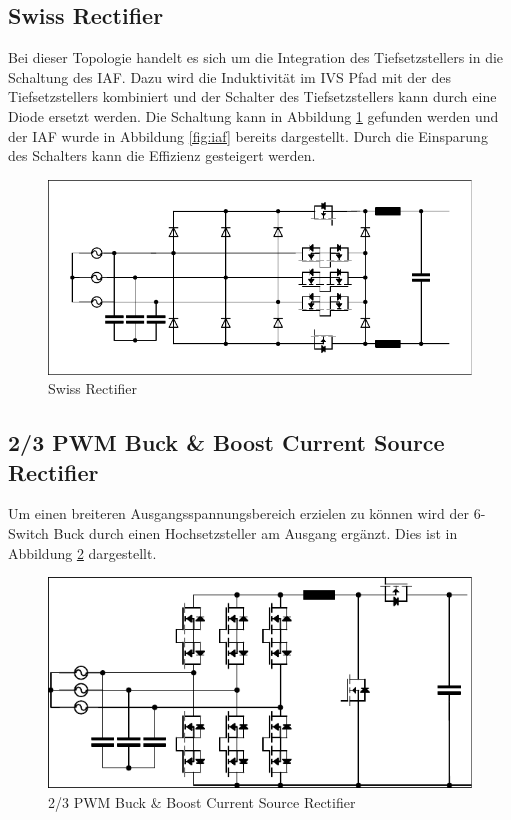 	\subsection{Swiss Rectifier}
		Bei dieser Topologie handelt es sich um die Integration des Tiefsetzstellers in die Schaltung des \gls{IAF}. Dazu wird die Induktivität im \gls{IVS} Pfad mit der des Tiefsetzstellers kombiniert und der Schalter des Tiefsetzstellers kann durch eine Diode ersetzt werden. Die Schaltung kann in Abbildung \ref{fig:swiss} gefunden werden und der \gls{IAF} wurde in Abbildung \ref{fig:iaf} bereits dargestellt. Durch die Einsparung des Schalters kann die Effizienz gesteigert werden. 
		\begin{figure}
			\centering
			\includegraphics[width=0.7\linewidth]{content/Grafiken/Swiss}
			\caption{Swiss Rectifier}
			\label{fig:swiss}
		\end{figure}
		
	\subsection{2/3 PWM Buck \& Boost Current Source Rectifier}	
		Um einen breiteren Ausgangsspannungsbereich erzielen zu können wird der 6-Switch Buck durch einen Hochsetzsteller am Ausgang ergänzt. Dies ist in Abbildung \ref{fig:23pwmbuckboost} dargestellt. 
		\begin{figure}
			\centering
			\includegraphics[width=0.7\linewidth]{content/Grafiken/23PWMBuckBoost}
			\caption{2/3 PWM Buck \& Boost Current Source Rectifier}
			\label{fig:23pwmbuckboost}
		\end{figure}
